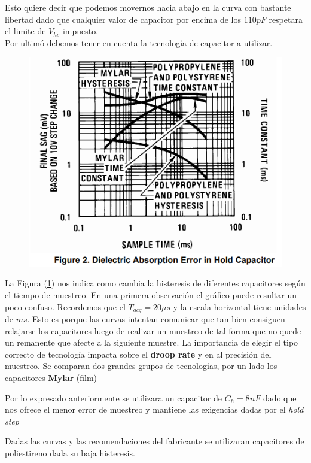 Esto quiere decir que podemos movernos hacia abajo en la curva con bastante libertad dado que cualquier valor de capacitor por encima de los $110pF$ respetara el limite de $V_{hs}$ impuesto.\\
Por ultimó debemos tener en cuenta la tecnología de capacitor a utilizar.
\begin{figure}[H]
	\centering
	\includegraphics[scale=0.7]{ImagenesEjercicio4/AbsorcionDielectrico}
	\caption{}
	\label{fig:absorciondielectrico}
\end{figure}
La Figura (\ref{fig:absorciondielectrico}) nos indica como cambia la histeresis de diferentes capacitores según el tiempo de muestreo. En una primera observación el gráfico puede resultar un poco confuso. Recordemos que el $T_{acq}=20\mu s$ y la escala horizontal tiene unidades de $ms$. Esto es porque las curvas intentan comunicar que tan bien consiguen relajarse los capacitores luego de realizar un muestreo de tal forma que no quede un remanente que afecte a la siguiente muestre.
La importancia de elegir el tipo correcto de tecnología impacta sobre el \textbf{droop rate} y en al precisión del muestreo. Se comparan dos grandes grupos de tecnologías, por un lado los capacitores \textbf{Mylar} (film)

Por lo expresado anteriormente se utilizara un capacitor de $C_h = 8nF$ dado que nos ofrece el menor error de muestreo y mantiene las exigencias dadas por el \textit{hold step}

Dadas las curvas y las recomendaciones del fabricante se utilizaran capacitores de poliestireno dada su baja histeresis.

